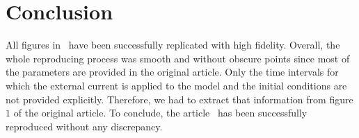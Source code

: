 \documentclass[10pt,a4paper,onecolumn]{article}
\begin{document}
\section{Conclusion}\label{conclusion}

All figures in~\textcite{mihalas:2009} have been successfully replicated 
with high fidelity. Overall, the whole reproducing process was smooth and
without obscure points since most of the parameters are provided in the
original article. Only the time intervals for which the external current is
applied to the model and the initial conditions are not provided explicitly.
Therefore, we had to extract that information from figure $1$ of the original
article. To conclude, the
article~\cite{mihalas:2009} has been successfully reproduced without any
discrepancy. 

{\sffamily \small
  \printbibliography[title=References]
}
\end{document}
